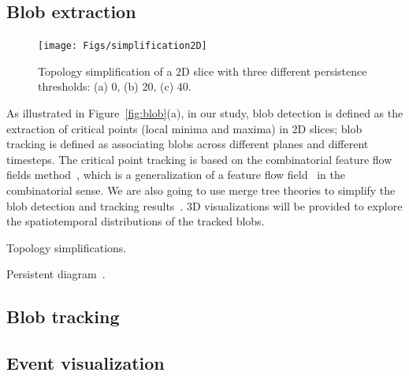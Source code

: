\subsection{Blob extraction}


\begin{figure}[!h]
  \centering
  \texttt{[image: Figs/simplification2D]}
  \caption{Topology simplification of a 2D slice with three different persistence thresholds: (a) 0, (b) 20, (c) 40.}
\end{figure}


As illustrated in Figure~\ref{fig:blob}(a), in our study, blob detection is defined as the extraction of critical points (local minima and maxima) in 2D slices; blob tracking is defined as associating blobs across different planes and different timesteps.  The critical point tracking is based on the combinatorial feature flow fields method~\cite{ReininghausKWH12}, which is a generalization of a feature flow field~\cite{TheiselS03} in the combinatorial sense.  We are also going to use merge tree theories to simplify the blob detection and tracking results~\cite{OesterlingHWMS17}.  3D visualizations will be provided to explore the spatiotemporal distributions of the tracked blobs.  

Topology simplifications.  

Persistent diagram~\cite{EdelsbrunnerLZ02}.  



\subsection{Blob tracking}



\subsection{Event visualization}

